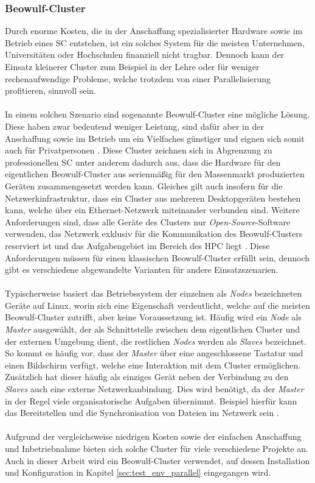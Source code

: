\subsubsection{Beowulf-Cluster}
\label{subsubsec:beowulf_cluster}
Durch enorme Kosten, die in der Anschaffung spezialisierter Hardware \cite{brown2004engineering} sowie im Betrieb eines \ac{SC} \cite{nielsen2016introduction} entstehen, ist ein solches System für die meisten Unternehmen, Universitäten oder Hochschulen finanziell nicht tragbar. Dennoch kann der Einsatz kleinerer Cluster zum Beispiel in der Lehre oder für weniger rechenaufwendige Probleme, welche trotzdem von einer Parallelisierung profitieren, sinnvoll sein. 
\\\\
In einem solchen Szenario sind sogenannte Beowulf-Cluster eine mögliche Lösung. Diese haben zwar bedeutend weniger Leistung, sind dafür aber in der Anschaffung sowie im Betrieb um ein Vielfaches günstiger und eignen sich somit auch für Privatpersonen \cite{adams2008microwulf}. Diese Cluster zeichnen sich in Abgrenzung zu professionellen \ac{SC} unter anderem dadurch aus, dass die Hardware für den eigentlichen Beowulf-Cluster aus serienmäßig für den Massenmarkt produzierten Geräten zusammengesetzt werden kann. Gleiches gilt auch insofern für die Netzwerkinfrastruktur, dass ein Cluster aus mehreren Desktopgeräten bestehen kann, welche über ein Ethernet-Netzwerk miteinander verbunden sind. Weitere Anforderungen sind, dass alle Geräte des Clusters nur \emph{Open-Source}-Software verwenden, das Netzwerk exklusiv für die Kommunikation des Beowulf-Clusters reserviert ist und das Aufgabengebiet im Bereich des \ac{HPC} liegt \cite{brown2004engineering}. Diese Anforderungen müssen für einen klassischen Beowulf-Cluster erfüllt sein, dennoch gibt es verschiedene abgewandelte Varianten für andere Einsatzszenarien.
\\\\
Typischerweise basiert das Betriebssystem der einzelnen als \emph{Nodes} bezeichneten Geräte auf Linux, worin sich eine Eigenschaft verdeutlicht, welche auf die meisten Beowulf-Cluster zutrifft, aber keine Voraussetzung ist. Häufig wird ein \emph{Node} als \emph{Master} ausgewählt, der als Schnittstelle zwischen dem eigentlichen Cluster und der externen Umgebung dient, die restlichen \emph{Nodes} werden als \emph{Slaves} bezeichnet. So kommt es häufig vor, dass der \emph{Master} über eine angeschlossene Tastatur und einen Bildschirm verfügt, welche eine Interaktion mit dem Cluster ermöglichen. Zusätzlich hat dieser häufig als einziges Gerät neben der Verbindung zu den \emph{Slaves} auch eine externe Netzwerkanbindung. Dies wird benötigt, da der \emph{Master} in der Regel viele organisatorische Aufgaben übernimmt. Beispiel hierfür kann das Bereitstellen und die Synchronisation von Dateien im Netzwerk sein \cite{brown2004engineering}.
\\\\
Aufgrund der vergleichsweise niedrigen Kosten sowie der einfachen Anschaffung und Inbetriebnahme bieten sich solche Cluster für viele verschiedene Projekte an. Auch in dieser Arbeit wird ein Beowulf-Cluster verwendet, auf dessen Installation und Konfiguration in Kapitel \ref{sec:test_env_parallel} eingegangen wird.

